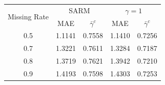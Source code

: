 \begin{tabular}{c|cc|cc}
\toprule
\multirow{2}{*}{Missing Rate} & \multicolumn{2}{c|}{SARM} & \multicolumn{2}{c}{$\gamma = 1$} \\
& MAE & $\bar{\gamma}^c$ & MAE & $\bar{\gamma}^c$ \\
\midrule
0.5 & 1.1141 & 0.7558 & 1.1410 & 0.7256 \\
0.7 & 1.3221 & 0.7611 & 1.3284 & 0.7187 \\
0.8 & 1.3719 & 0.7621 & 1.3942 & 0.7210 \\
0.9 & 1.4193 & 0.7598 & 1.4303 & 0.7253 \\
\bottomrule
\end{tabular}